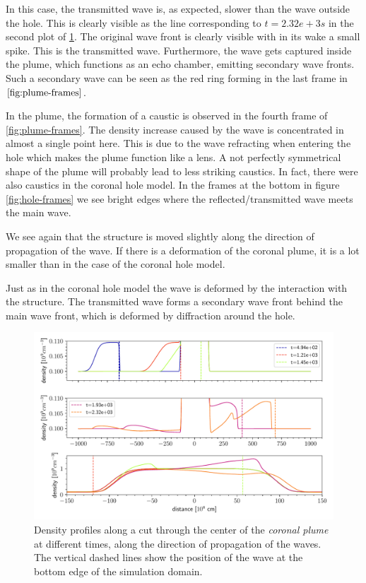 In this case, the transmitted wave is, as expected, slower than the wave outside the hole.
This is clearly visible as the line corresponding to $t=2.32e+3 s$ in the second plot of \cref{fig:plume-sections}.
The original wave front is clearly visible with in its wake a small spike. This is the transmitted wave.
Furthermore, the wave gets captured inside the plume, which functions as an echo chamber, emitting secondary wave fronts.
Such a secondary wave can be seen as the red ring forming in the last frame in $\cref{fig:plume-frames}$.

In the plume, the formation of a caustic is observed in the fourth frame of \cref{fig:plume-frames}. 
The density increase caused by the wave is concentrated in almost a single point here. 
This is due to the wave refracting when entering the hole which makes the plume function like a lens.
A not perfectly symmetrical shape of the plume will probably lead to less striking caustics.
In fact, there were also caustics in the coronal hole model.
In the frames at the bottom in figure \cref{fig:hole-frames} we see bright edges where the reflected/transmitted wave meets the main wave.

We see again that the structure is moved slightly along the direction of propagation of the wave. 
If there is a deformation of the coronal plume, it is a lot smaller than in the case of the coronal hole model.

Just as in the coronal hole model the wave is deformed by the interaction with the structure.
The transmitted wave forms a secondary wave front behind the main wave front, which is deformed by diffraction around the hole.

\begin{figure}[H]
	\centering
	\includegraphics[width=\linewidth]{images/plume-sections.pdf}
	\caption{Density profiles along a cut through the center of the \emph{coronal plume} at different times, along the direction of propagation of the waves.
	The vertical dashed lines show the position of the wave at the bottom edge of the simulation domain.}
	\label{fig:plume-sections}
\end{figure}

